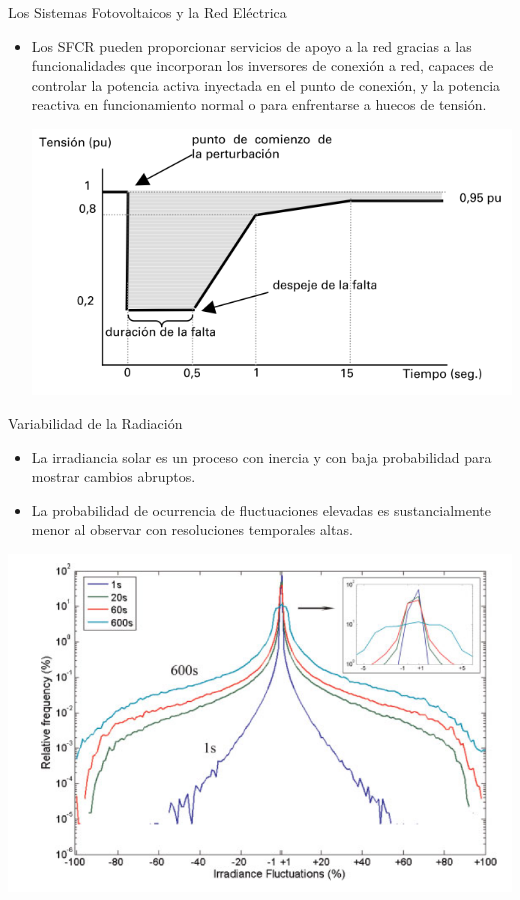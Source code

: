\documentclass[aspectratio=169, usenames,svgnames,dvipsnames]{beamer}
\begin{document}
\begin{frame}[label={sec:org20a79dd}]{Los Sistemas Fotovoltaicos y la Red Eléctrica}
\begin{itemize}
\item Los SFCR pueden proporcionar servicios de apoyo a la red gracias a
las funcionalidades que incorporan los inversores de conexión a red,
capaces de controlar la potencia activa inyectada en el punto de
conexión, y la potencia reactiva en funcionamiento normal o para
enfrentarse a huecos de tensión.

\begin{center}
\includegraphics[height=0.7\textheight]{../figs/hueco-tension.png}
\end{center}
\end{itemize}
\end{frame}

\begin{frame}[label={sec:org041cefe}]{Variabilidad de la Radiación}
\begin{itemize}
\item La irradiancia solar es un proceso con inercia y con baja
probabilidad para mostrar cambios abruptos.

\item La probabilidad de ocurrencia de fluctuaciones elevadas es
sustancialmente menor al observar con resoluciones temporales
altas.
\end{itemize}

\begin{center}
\includegraphics[height=0.65\textheight]{../figs/FluctuacionIrradiancia_Marcosetal2011.png}
\end{center}
\end{frame}
\end{document}
